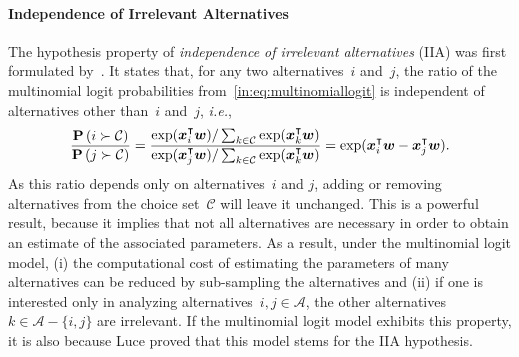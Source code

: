 \paragraph{Independence of Irrelevant Alternatives}

The hypothesis property of \emph{independence of irrelevant alternatives} (IIA) was first formulated by~\citet{luce1959individual}.
It states that, for any two alternatives~$i$ and~$j$, the ratio of the multinomial logit probabilities from~\eqref{in:eq:multinomiallogit} is independent of alternatives other than~$i$ and~$j$, \textit{i.e.},
\begin{equation}
	\frac{\mathbf{P}\left( i \succ \mathcal{C} \right)}{\mathbf{P}\left( j \succ \mathcal{C} \right)}
	= \frac{\exp(\bm{x}_i^\intercal \bm{w}) / \sum_{k \in \mathcal{C}} \exp(\bm{x}_k^\intercal \bm{w})}{\exp(\bm{x}_j^\intercal \bm{w}) / \sum_{k \in \mathcal{C}} \exp(\bm{x}_k^\intercal \bm{w})}
	= \exp(\bm{x}_i^\intercal \bm{w} - \bm{x}_j^\intercal \bm{w}).
\end{equation}
As this ratio depends only on alternatives~$i$ and $j$, adding or removing alternatives from the choice set~$\mathcal{C}$ will leave it unchanged.
This is a powerful result, because it implies that not all alternatives are necessary in order to obtain an estimate of the associated parameters.
As a result, under the multinomial logit model, (i) the computational cost of estimating the parameters of many alternatives can be reduced by sub-sampling the alternatives and (ii) if one is interested only in analyzing alternatives~$i,j \in \mathcal{A}$, the other alternatives~$k \in \mathcal{A} - \{i, j\}$ are irrelevant.
If the multinomial logit model exhibits this property, it is also because Luce proved that this model stems for the IIA hypothesis.

